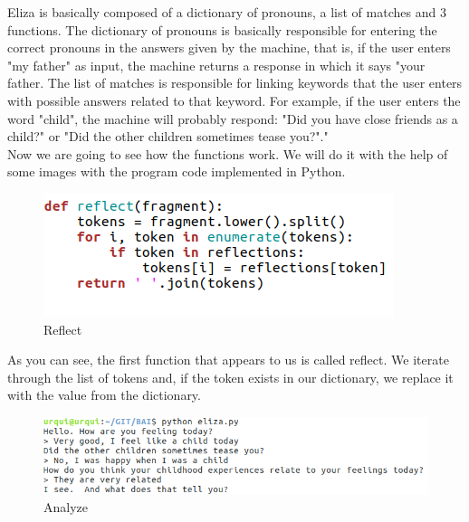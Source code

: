 \documentclass[12pt,twoside]{article}
\theoremstyle{plain}
\theoremstyle{definition}
\theoremstyle{remark}
\begin{document}
Eliza is basically composed of a dictionary of pronouns, a list of matches and 3 functions.\cite{small2017} The dictionary of pronouns is basically responsible for entering the correct pronouns in the answers given by the machine, that is, if the user enters "my father" as input, the machine returns a response in which it says "your father. The list of matches is responsible for linking keywords that the user enters with possible answers related to that keyword. For example, if the user enters the word "child", the machine will probably respond: "Did you have close friends as a child?" or "Did the other children sometimes tease you?"."\cite{small2017}\\

Now we are going to see how the functions work. We will do it with the help of some images with the program code implemented in Python.\\

\begin{figure}[h]
\centering
\includegraphics[scale=0.6]{./Pictures/reflect.png}
\caption{Reflect} 
\end{figure}

As you can see, the first function that appears to us is called reflect. We iterate through the list of tokens and, if the token exists in our dictionary, we replace it with the value from the dictionary.

\begin{figure}[h]
\centering
\includegraphics[scale=0.6]{./Pictures/example.png}
\caption{Analyze}
\label{fig:analyze}
\end{figure}
\end{document}
